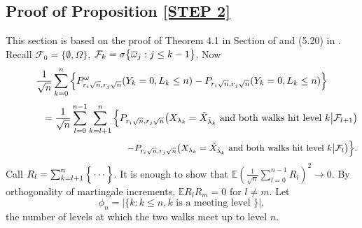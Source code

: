 \documentclass[11pt]{amsart}
\begin{document}
\bigskip

\subsection{Proof of Proposition \ref{STEP 2}}
This section is based on the proof of Theorem 4.1 in Section of \cite{ff}  and (5.20) in \cite{brs}. Recall $\mathcal{F}_0 = \{ \emptyset , \Omega\}$, $\mathcal{F}_k = \sigma\big{\{} \overline{\omega}_j : j\le k-1 \big{\}}$.
Now
\[ \frac{1}{\sqrt{n}} \sum_{k=0}^{n} \Big{\lbrace}P_{r_i \sqrt{n},r_j \sqrt{n}}^{\omega}(Y_k=0,L_k \leq n)-P_{r_i \sqrt{n},r_j \sqrt{n}}(Y_k=0,L_k \leq n)\Big{\rbrace}  \]
\[ \qquad \qquad =\frac{1}{\sqrt{n}}\sum_{l=0}^{n-1} \sum_{k=l+1}^{n} \Big{\lbrace} P_{r_i\sqrt{n},r_j \sqrt{n}}\big{(}X_{\lambda_k}= \tilde{X}_{\tilde{\lambda}_k} \mbox{ and both walks hit level } k \big{\vert} \mathcal{F}_{l+1} \big{)} \]
\[\qquad \qquad \qquad \qquad \qquad \qquad \quad \, \, -P_{r_i \sqrt{n},r_j \sqrt{n}}\big{(}X_{\lambda_k}= \tilde{X}_{\tilde{\lambda}_k} \mbox{ and both walks hit level } k \big{\vert} \mathcal{F}_{l}\big{)} \Big{\rbrace}. \]
\vspace{0.2cm}
Call $R_l= \sum_{k=l+1}^n \Big{\lbrace} \cdots \Big{\rbrace}$. It is enough to show that $\mathbb{E} (\frac{1}{\sqrt{n}}\sum_{l=0}^{n-1}  R_l)^2  \to 0$. By orthogonality of martingale increments, $\mathbb{E}R_lR_m =0 \mbox{ for } l \neq m$. Let 
 \[ \phi_n= \vert\{k: k \le n ,k \mbox{ is a meeting level } \} \vert ,\]
the number of levels at which the two walks meet up to level $n$.

\bigskip
\end{document}
